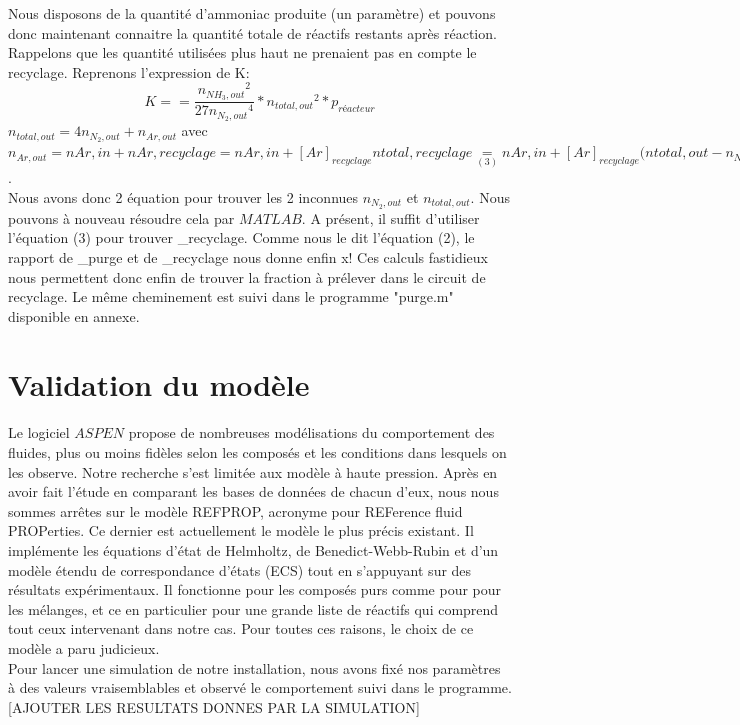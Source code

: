 \documentclass[a4paper, oneside, 12pt]{article}
\begin{document}
Nous disposons de la quantité d'ammoniac produite (un paramètre) et pouvons donc maintenant connaitre la quantité totale de réactifs restants après réaction. Rappelons que les quantité utilisées plus haut ne prenaient pas en compte le recyclage. Reprenons l'expression de K: \\
$$K==\frac{{n_{NH_3,out}}^2}{27{n_{N_2,out}}^4}*{n_{total,out}}^2*p_{réacteur}$$
$n_{total,out}=4n_{N_2,out}+n_{Ar,out}$ avec $n_{Ar,out}=n{Ar,in}+n{Ar,recyclage}=n{Ar,in}+[Ar]_{recyclage}n{total,recyclage}\underset{(3)}=n{Ar,in}+[Ar]_{recyclage}(n{total,out}-n_{NH_3,out}$.\\
Nous avons donc 2 équation pour trouver les 2 inconnues $n_{N_2,out}$ et $n_{total,out}$. Nous pouvons à nouveau résoudre cela par $MATLAB$. A présent, il suffit d'utiliser l'équation (3) pour trouver _{recyclage}. Comme nous le dit l'équation (2), le rapport de _{purge} et de _{recyclage} nous donne enfin x! Ces calculs fastidieux nous permettent donc enfin de trouver la fraction à prélever dans le circuit de recyclage. Le même cheminement est suivi dans le programme "purge.m" disponible en annexe.

\section{Validation du modèle}
Le logiciel $ASPEN$ propose de nombreuses modélisations du comportement des fluides, plus ou moins fidèles selon les composés et les conditions dans lesquels on les observe. Notre recherche s'est limitée aux modèle à haute pression. Après en avoir fait l'étude en comparant les bases de données de chacun d'eux, nous nous sommes arrêtes sur le modèle REFPROP, acronyme pour REFerence fluid PROPerties. Ce dernier est actuellement le modèle le plus précis existant. Il implémente les équations d'état de Helmholtz, de Benedict-Webb-Rubin et d'un modèle étendu de correspondance d'états (ECS) tout en s'appuyant sur des résultats expérimentaux. Il fonctionne pour les composés purs comme pour pour les mélanges, et ce en particulier pour une grande liste de réactifs qui comprend tout ceux intervenant dans notre cas. Pour toutes ces raisons, le choix de ce modèle a paru judicieux.\\
Pour lancer une simulation de notre installation, nous avons fixé nos paramètres à des valeurs vraisemblables et observé le comportement suivi dans le programme. 
[AJOUTER LES RESULTATS DONNES PAR LA SIMULATION]
\end{document}
